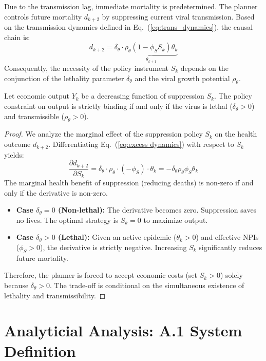 \documentclass[12pt, a4paper]{article}
\begin{document}
Due to the transmission lag, immediate mortality is predetermined. The planner controls future mortality $d_{k+2}$ by suppressing current viral transmission. Based on the transmission dynamics defined in Eq.~(\ref{eq:trans_dynamics}), the causal chain is:
\begin{equation}
    d_{k+2} = \delta_\theta \cdot \underbrace{\rho_\theta (1 - \phi_S S_k) \theta_k}_{\theta_{k+1}}
    \label{eq:excess dynamics}
\end{equation}
Consequently, the necessity of the policy instrument $S_k$ depends on the conjunction of the lethality parameter $\delta_\theta$ and the viral growth potential $\rho_\theta$.

Let economic output $Y_k$ be a decreasing function of suppression $S_k$. The policy constraint on output is strictly binding if and only if the virus is lethal ($\delta_\theta > 0$) and transmissible ($\rho_\theta > 0$).


\begin{proof}
    We analyze the marginal effect of the suppression policy $S_k$ on the health outcome $d_{k+2}$. Differentiating Eq.~(\ref{eq:excess dynamics}) with respect to $S_k$ yields:
    \begin{equation}
        \frac{\partial d_{k+2}}{\partial S_k} = \delta_\theta \cdot \rho_\theta \cdot (-\phi_S) \cdot \theta_k = - \delta_\theta \rho_\theta \phi_S \theta_k
    \end{equation}
    The marginal health benefit of suppression (reducing deaths) is non-zero if and only if the derivative is non-zero.
    \begin{itemize}
        \item \textbf{Case $\delta_\theta = 0$ (Non-lethal):} The derivative becomes zero. Suppression saves no lives. The optimal strategy is $S_k=0$ to maximize output.
        \item \textbf{Case $\delta_\theta > 0$ (Lethal):} Given an active epidemic ($\theta_k > 0$) and effective NPIs ($\phi_S > 0$), the derivative is strictly negative. Increasing $S_k$ significantly reduces future mortality.
    \end{itemize}
    Therefore, the planner is forced to accept economic costs (set $S_k > 0$) solely because $\delta_\theta > 0$. The trade-off is conditional on the simultaneous existence of lethality and transmissibility.
\end{proof}

\section{Analyticial Analysis: A.1 System Definition}
\end{document}
